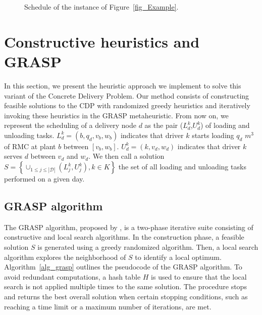 \begin{figure}[htbp]
\begin{adjustbox}{max width=0.85\textwidth}
\begin{tikzpicture}[-latex]
        \end{tikzpicture}
    \end{adjustbox}
    \caption{Schedule of the instance of Figure~\ref{fig_Example}.}
    \label{fig:ganttExample}
\end{figure}

\section{Constructive heuristics and GRASP}
\label{sec:cdp_grasp_method}

In this section, we present the heuristic approach we implement to solve this variant of the Concrete Delivery Problem. Our method consists of constructing feasible solutions to the CDP with randomized greedy heuristics and iteratively invoking these heuristics in the GRASP metaheuristic. From now on, we represent the scheduling of a delivery node $d$ as the pair  ($L^k_{d}$,$U^k_{d}$) of loading and unloading tasks. $L^k_{d} = \left(b,q_d,v_b,w_b\right)$ indicates that driver $k$ starts loading $q_d$ $m^3$ of RMC at plant $b$ between $\left[v_b,w_b\right]$. $U^k_{d} = \left(k,v_d, w_d\right)$ indicates that driver $k$ serves $d$ between $v_d$ and $w_d$. We then call a solution $ S =\left\lbrace \cup _{1 \leq j \leq |\mathcal{D}|} (L^k_{j}, U^k_{j}), k \in K \right\rbrace$ the set of all loading and unloading tasks performed on a given day.

\subsection{GRASP algorithm }

The GRASP algorithm, proposed by \cite{feo1989probabilistic}, is a two-phase iterative suite consisting of constructive and local search algorithms. In the construction phase, a feasible solution $S$ is generated using a greedy randomized algorithm. Then, a local search algorithm explores the neighborhood of $S$ to identify a local optimum. Algorithm~\ref{alg_grasp} outlines the pseudocode of the GRASP algorithm. To avoid redundant computations, a hash table $H$ is used to ensure that the local search is not applied multiple times to the same solution.  The procedure stops and returns the best overall solution when certain stopping conditions, such as reaching a time limit or a maximum number of iterations, are met. %

